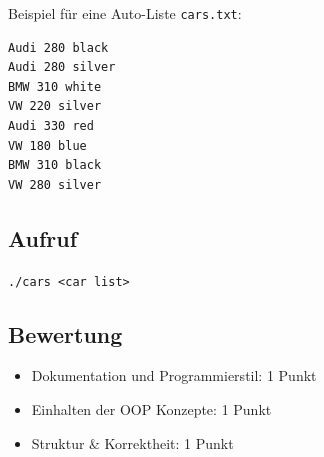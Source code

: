 \documentclass[a4paper,10pt]{article}
\begin{document}
Beispiel für eine Auto-Liste \texttt{cars.txt}:
\begin{lstlisting}[frame=single]
Audi 280 black
Audi 280 silver
BMW 310 white
VW 220 silver
Audi 330 red
VW 180 blue
BMW 310 black
VW 280 silver
\end{lstlisting}


\subsection*{Aufruf}
\texttt{./cars <car list>}

\subsection*{Bewertung}
\begin{itemize}
 \item Dokumentation und Programmierstil: 1 Punkt
 \item Einhalten der OOP Konzepte: 1 Punkt
 \item Struktur \& Korrektheit: 1 Punkt
\end{itemize}

\newpage
\end{document}
